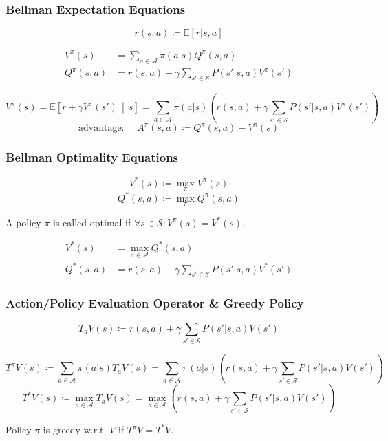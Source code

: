 \documentclass[UTF8,11pt,colorlinks,compress,openany]{beamer}%
\begin{document}
\begin{frame}\frametitle{Bellman Expectation Equations}
\[r(s,a)\coloneqq \mathbb{E}[r|s,a]\]
\begin{block}{}
\begin{align*}
V^\pi(s)&=\sum\limits_{a\in\mathcal{A}}\pi(a|s)Q^\pi(s,a)\\
Q^\pi(s,a)&=r(s,a)+\gamma\sum\limits_{s'\in\mathcal{S}}P(s'|s,a)V^\pi(s')
\end{align*}
\end{block}
\[V^\pi(s)=\mathbb{E}\left[r+\gamma V^\pi(s')\,\middle|\, s\right]=\sum\limits_{a\in\mathcal{A}}\pi(a|s)\left(r(s,a)+\gamma\sum\limits_{s'\in\mathcal{S}}P(s'|s,a)V^\pi(s')\right)\]
\[\mbox{advantage: }\quad A^\pi(s,a)\coloneqq Q^\pi(s,a)-V^\pi(s)\]
\end{frame}

\begin{frame}\frametitle{Bellman Optimality Equations}
	\begin{definition}
		\[V^*(s)\coloneqq \max\limits_\pi V^\pi(s)\]
		\[Q^*(s,a)\coloneqq \max\limits_\pi Q^\pi(s,a)\]
	\end{definition}
	\begin{definition}
		A policy $\pi$ is called optimal if $\forall s\in\mathcal{S}: V^\pi(s)=V^*(s)$.
	\end{definition}
\setlength\abovedisplayskip{0pt}
\setlength\belowdisplayskip{0pt}
	\begin{block}{}
		\begin{align*}
		V^*(s)&=\max\limits_{a\in\mathcal{A}}Q^*(s,a)\\
		Q^*(s,a)&=r(s,a)+\gamma\sum\limits_{s'\in\mathcal{S}}P(s'|s,a)V^*(s')
		\end{align*}
	\end{block}
\end{frame}

\begin{frame}\frametitle{Action/Policy Evaluation Operator \& Greedy Policy}
	\begin{definition}
		\[T_aV(s)\coloneqq r(s,a)+\gamma\sum\limits_{s'\in\mathcal{S}}P(s'|s,a)V(s')\]
	\end{definition}
\setlength\abovedisplayskip{0pt}
\setlength\belowdisplayskip{0pt}
	\begin{definition}
		\[T^\pi V(s)\coloneqq \sum\limits_{a\in\mathcal{A}}\pi(a|s)T_aV(s)=\sum\limits_{a\in\mathcal{A}}\pi(a|s)\left(r(s,a)+\gamma\sum\limits_{s'\in\mathcal{S}}P(s'|s,a)V(s')\right)\]
		\[T^* V(s)\coloneqq \max\limits_{a\in\mathcal{A}}T_aV(s)=\max\limits_{a\in\mathcal{A}}\left(r(s,a)+\gamma\sum\limits_{s'\in\mathcal{S}}P(s'|s,a)V(s')\right)\]
	\end{definition}
	\begin{definition}
		Policy $\pi$ is greedy w.r.t. $V$ if $T^\pi V=T^* V$.
	\end{definition}	
\end{frame}
\end{document}
